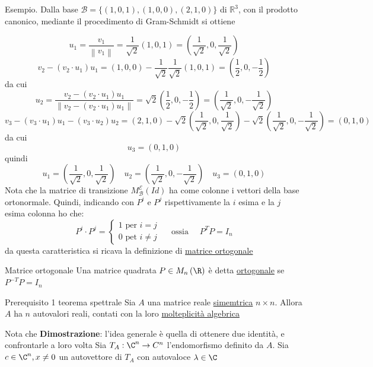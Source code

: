 Esempio. Dalla base $\mathcal{B}=\{(1,0,1),(1,0,0),(2,1,0)\}$ di $\mathbb{R}^3$, con il prodotto canonico, mediante il procedimento di Gram-Schmidt si ottiene

\[
	u_1=\frac{v_1}{\left\|v_1\right\|}=\frac{1}{\sqrt{2}}(1,0,1)=\left(\frac{1}{\sqrt{2}}, 0, \frac{1}{\sqrt{2}}\right)
\]
\[
	v_2-\left(v_2 \cdot u_1\right) u_1=(1,0,0)-\frac{1}{\sqrt{2}} \frac{1}{\sqrt{2}}(1,0,1)=\left(\frac{1}{2}, 0,-\frac{1}{2}\right)
\]
da cui
\[
	u_2=\frac{v_2-\left(v_2 \cdot u_1\right) u_1}{\left\|v_2-\left(v_2 \cdot u_1\right) u_1\right\|}=\sqrt{2}\left(\frac{1}{2}, 0,-\frac{1}{2}\right)=\left(\frac{1}{\sqrt{2}}, 0,-\frac{1}{\sqrt{2}}\right)
\]
\[
	v_3-\left(v_3 \cdot u_1\right) u_1-\left(v_3 \cdot u_2\right) u_2=(2,1,0)-\sqrt{2}\left(\frac{1}{\sqrt{2}}, 0, \frac{1}{\sqrt{2}}\right)-\sqrt{2}\left(\frac{1}{\sqrt{2}}, 0,-\frac{1}{\sqrt{2}}\right)=(0,1,0)
\]
da cui
\[
	u_3=(0,1,0)
\]
quindi
\[
	u_1 = \left( \frac{1}{\sqrt{2} },0, \frac{1}{\sqrt{2} } \right) \quad u_2= \left( \frac{1}{\sqrt{2} },0,-\frac{1}{\sqrt{2} } \right) \quad  u_3= \left( 0,1,0 \right)
\]
Nota che la matrice di transizione $ M_{ \mathcal{B}}^{ \mathcal{E}} \left( Id \right)  $ ha come colonne i vettori della base ortonormale. Quindi, indicando con $ P^{i} $ e $ P^{j} $ rispettivamente la $ i $ esima e la $ j $ esima colonna ho che:
\[
	P^{i}\cdot P^{j}=
	\begin{cases}
		1 \text{ per }i = j \\
		0 \text{ pet }i \neq j
	\end{cases}
	\quad \text{ ossia } \quad
	P^{T} P = I_n
\]
da questa caratteristica si ricava la definizione di \underline{matrice ortogonale}

\begin{definizione}{Matrice ortogonale}
	Una matrice quadrata $ P \in  M_n \left( \R \right)  $ è detta \underline{ortogonale} se $ P^{-T} P = I_n $
\end{definizione}

\begin{teorema}{Prerequisito 1 teorema spettrale}
	Sia $ A $ una matrice reale \underline{simemtrica} $ n \times n $. Allora $ A $ ha $ n $ autovalori reali, contati con la loro \underline{molteplicità algebrica}
\end{teorema}
Nota che
\label{teo:prerequisitoSpettrale}
\textbf{Dimostrazione}: l'idea generale è quella di ottenere due identità, e confrontarle a loro volta
\vskip3mm
Sia $ T_A:\C ^{n} \to C^{n} $ l'endomorfismo definito da $ A $. Sia $  c \in \C^{n}, x \neq 0 $ un autovettore di $  T_A $ con autovaloce $ \lambda  \in \C $

